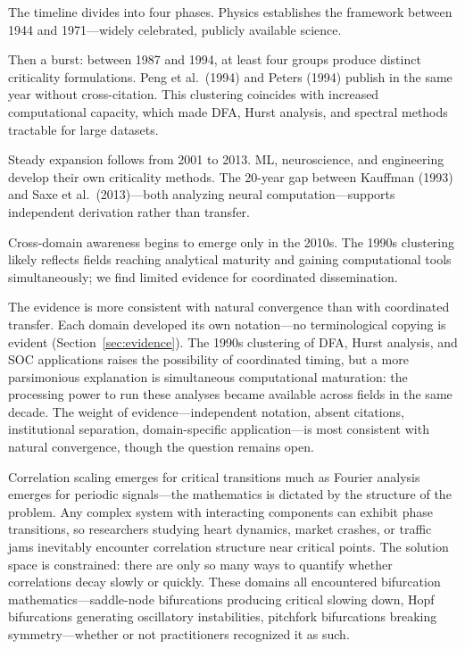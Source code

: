\documentclass[11pt]{article}
\begin{document}
The timeline divides into four phases. Physics establishes the framework between 1944 and 1971---widely celebrated, publicly available science.

Then a burst: between 1987 and 1994, at least four groups produce distinct criticality formulations. Peng et al.\ (1994) and Peters (1994) publish in the same year without cross-citation. This clustering coincides with increased computational capacity, which made DFA, Hurst analysis, and spectral methods tractable for large datasets.

Steady expansion follows from 2001 to 2013. ML, neuroscience, and engineering develop their own criticality methods. The 20-year gap between Kauffman (1993) and Saxe et al.\ (2013)---both analyzing neural computation---supports independent derivation rather than transfer.

Cross-domain awareness begins to emerge only in the 2010s. The 1990s clustering likely reflects fields reaching analytical maturity and gaining computational tools simultaneously; we find limited evidence for coordinated dissemination.

The evidence is more consistent with natural convergence than with coordinated transfer. Each domain developed its own notation---no terminological copying is evident (Section~\ref{sec:evidence}). The 1990s clustering of DFA, Hurst analysis, and SOC applications raises the possibility of coordinated timing, but a more parsimonious explanation is simultaneous computational maturation: the processing power to run these analyses became available across fields in the same decade. The weight of evidence---independent notation, absent citations, institutional separation, domain-specific application---is most consistent with natural convergence, though the question remains open.

Correlation scaling emerges for critical transitions much as Fourier analysis emerges for periodic signals---the mathematics is dictated by the structure of the problem. Any complex system with interacting components can exhibit phase transitions, so researchers studying heart dynamics, market crashes, or traffic jams inevitably encounter correlation structure near critical points. The solution space is constrained: there are only so many ways to quantify whether correlations decay slowly or quickly. These domains all encountered bifurcation mathematics---saddle-node bifurcations producing critical slowing down, Hopf bifurcations generating oscillatory instabilities, pitchfork bifurcations breaking symmetry---whether or not practitioners recognized it as such.
\end{document}
